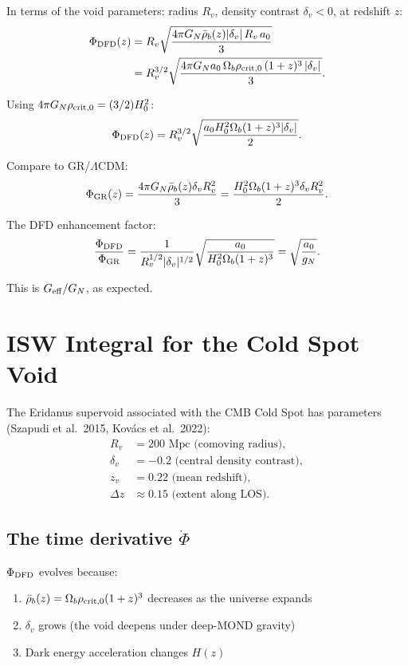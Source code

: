 \documentclass[11pt]{article}
\newcommand{\LCDM}{$\Lambda$CDM}
\newcommand{\Geff}{G_{\rm eff}}
\newcommand{\aM}{a_0}
\newcommand{\rhob}{\bar{\rho}_b}
\newcommand{\Ob}{\Omega_b}
\begin{document}
In terms of the void parameters: radius $R_v$, density contrast
$\delta_v < 0$, at redshift $z$:
\begin{align}
\Phi_{\rm DFD}(z) &= R_v\sqrt{\frac{4\pi G_N\rhob(z)|\delta_v|\,R_v\,\aM}{3}} \\
&= R_v^{3/2}\sqrt{\frac{4\pi G_N\aM\,\Ob\rho_{\rm crit,0}\,(1+z)^3\,|\delta_v|}{3}}.
\end{align}

Using $4\pi G_N\rho_{\rm crit,0} = (3/2)H_0^2$:
\begin{equation}
\Phi_{\rm DFD}(z) = R_v^{3/2}\sqrt{\frac{\aM H_0^2\Ob(1+z)^3|\delta_v|}{2}}.
\label{eq:Phi-void}
\end{equation}

Compare to GR/\LCDM:
\begin{equation}
\Phi_{\rm GR}(z) = \frac{4\pi G_N\rhob(z)\delta_v R_v^2}{3}
= \frac{H_0^2\Ob(1+z)^3\delta_v R_v^2}{2}.
\label{eq:Phi-GR}
\end{equation}

The DFD enhancement factor:
\begin{equation}
\frac{\Phi_{\rm DFD}}{\Phi_{\rm GR}}
= \frac{1}{R_v^{1/2}|\delta_v|^{1/2}}
\sqrt{\frac{\aM}{H_0^2\Ob(1+z)^3}}
= \sqrt{\frac{\aM}{g_N}}.
\end{equation}

This is $\Geff/G_N$, as expected.

\section{ISW Integral for the Cold Spot Void}

The Eridanus supervoid associated with the CMB Cold Spot has
parameters (Szapudi et al.\ 2015, Kov\'acs et al.\ 2022):
\begin{align}
R_v &= 200\text{ Mpc (comoving radius)}, \\
\delta_v &= -0.2\text{ (central density contrast)}, \\
z_v &= 0.22\text{ (mean redshift)}, \\
\Delta z &\approx 0.15\text{ (extent along LOS)}.
\end{align}

\subsection{The time derivative $\dot\Phi$}

$\Phi_{\rm DFD}$ evolves because:
\begin{enumerate}
\item $\rhob(z) = \Ob\rho_{\rm crit,0}(1+z)^3$ decreases as the universe
  expands
\item $\delta_v$ grows (the void deepens under deep-MOND gravity)
\item Dark energy acceleration changes $H(z)$
\end{enumerate}
\end{document}

